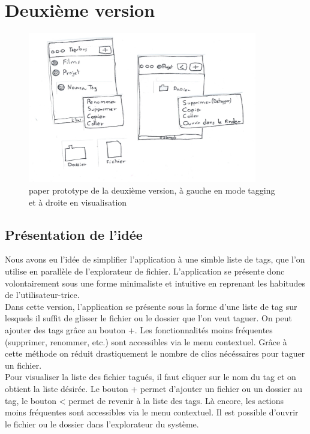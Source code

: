 \documentclass{report}
\begin{document}
    \section{Deuxième version}
            \begin{figure}[htbp]
            \begin{center}
                \includegraphics[width=10cm]{version2.png}
                \caption{paper prototype de la deuxième version, à gauche en mode tagging et à droite en visualisation}
                \end{center}
            \end{figure}
        \subsection{Présentation de l'idée}
            Nous avons eu l'idée de simplifier l'application à une simble liste de tags, que l'on utilise en parallèle de l'explorateur de fichier. L'application se présente donc volontairement sous une forme minimaliste et intuitive en reprenant les habitudes de l'utilisateur-trice.\\
            
            Dans cette version, l'application se présente sous la forme d'une liste de tag sur lesquels il suffit de glisser le fichier ou le dossier que l'on veut taguer. On peut ajouter des tags grâce au bouton +. Les fonctionnalités moins fréquentes (supprimer, renommer, etc.) sont accessibles via le menu contextuel. Grâce à cette méthode on réduit drastiquement le nombre de clics nécéssaires pour taguer un fichier.\\
            
            Pour visualiser la liste des fichier tagués, il faut cliquer sur le nom du tag et on obtient la liste désirée. Le bouton + permet d'ajouter un fichier ou un dossier au tag, le bouton < permet de revenir à la liste des tags. Là encore, les actions moins fréquentes sont accessibles via le menu contextuel. Il est possible d'ouvrir le fichier ou le dossier dans l'explorateur du système.\\
            
\end{document}
